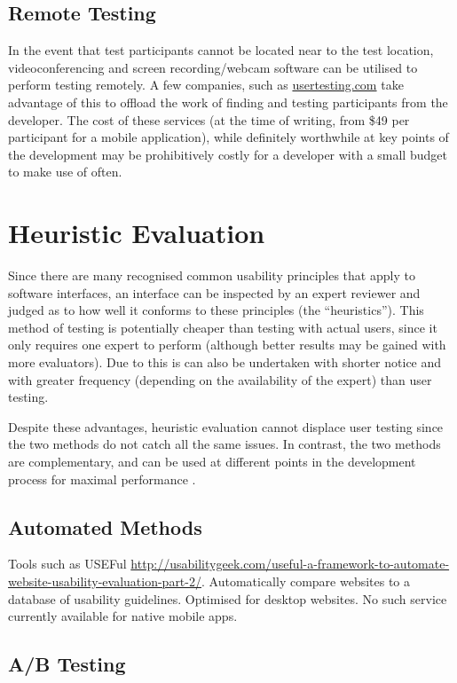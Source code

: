 \subsection{Remote Testing}

In the event that test participants cannot be located near to the test
location, videoconferencing and screen recording/webcam software can be
utilised to perform testing remotely. A few companies, such as
\url{usertesting.com} take advantage of this to offload the work of finding and
testing participants from the developer.  The cost of these services (at the
time of writing, from \$49 per participant for a mobile application), while
definitely worthwhile at key points of the development may be prohibitively
costly for a developer with a small budget to make use of often.

\section{Heuristic Evaluation}

Since there are many recognised common usability principles that apply to
software interfaces, an interface can be inspected by an expert reviewer and
judged as to how well it conforms to these principles (the ``heuristics'').
This method of testing is potentially cheaper than testing with actual users,
since it only requires one expert to perform (although better results may be
gained with more evaluators).  Due to this is can also be undertaken with
shorter notice and with greater frequency (depending on the availability of the
expert) than user testing.

Despite these advantages, heuristic evaluation cannot displace user testing
since the two methods do not catch all the same issues. In contrast, the two
methods are complementary, and can be used at different points in the
development process for maximal performance \cite{tan2009web, archer2010web}.

\subsection{Automated Methods}

Tools such as USEFul \cite{dingli2011useful}
\url{http://usabilitygeek.com/useful-a-framework-to-automate-website-usability-evaluation-part-2/}.
Automatically compare websites to a database of usability guidelines. Optimised
for desktop websites. No such service currently available for native mobile
apps.

\subsection{A/B Testing}
